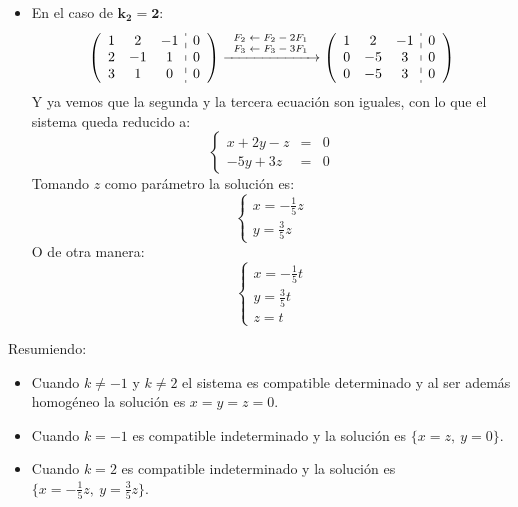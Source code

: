 \documentclass[a4paper,11pt,answers]{exam}
\begin{document}
\begin{questions}
\begin{solution}
\begin{itemize}
	\item En el caso de $\boldsymbol{k_2=2}$:
	\[\left(\begin{array}{ccc:c}
		1&2&-1&0\\
		2&-1&1&0\\
		3&1&0&0
	\end{array}\right) \xrightarrow{\begin{scriptsize}
	\begin{array}{c}
	F_2 \leftarrow F_2 - 2F_1\\
	F_3 \leftarrow F_3 - 3F_1
	\end{array}
	\end{scriptsize}} \left(\begin{array}{ccc:c}
		1&2&-1&0\\
		0&-5&3&0\\
		0&-5&3&0
	\end{array}\right)\]
	Y ya vemos que la segunda y la tercera ecuación son iguales, con lo que el sistema queda reducido a:
	\[\left\lbrace\begin{array}{lll}
	x +2y -z &=& 0\\
	 -5y + 3z &=& 0
	\end{array}
	\right.\]
	Tomando $z$ como parámetro la solución es:
	\[\left\lbrace\begin{array}{l}
	x = -\frac{1}{5}z\\
	 y = \frac{3}{5}z
	\end{array}
	\right.\]
	O de otra manera:
	\[\left\lbrace\begin{array}{l}
		x = -\frac{1}{5}t\\
		y = \frac{3}{5}t\\
		z = t
	\end{array}
	\right.\]
	\end{itemize}
	
	Resumiendo:
	\begin{itemize}
		\item Cuando $k\neq -1$ y $k \neq 2$ el sistema es compatible determinado y al ser además homogéneo la solución es $x=y=z=0$.
		\item Cuando $k=-1$ es compatible indeterminado y la solución es
		$\lbrace x=z,\ y=0 \rbrace$.
		\item Cuando $k=2$ es compatible indeterminado y la solución es 
		$\lbrace x=-\frac{1}{5}z,\ y=\frac{3}{5}z \rbrace$.
	\end{itemize}
\end{solution}


\end{questions}
\end{document}
